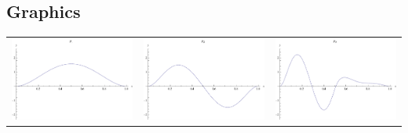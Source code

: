 \documentclass{article}
\begin{document}
\begin{landscape}
\subsection{Graphics}
\begin{tabular}{ccc}
\includegraphics[width=6.7cm]{quintic_bspline_1.pdf}& \includegraphics[width=6.7cm]{quintic_bspline_2.pdf}& \includegraphics[width=6.7cm]{quintic_bspline_3.pdf} \\

\end{tabular}
\end{landscape}
\end{document}
